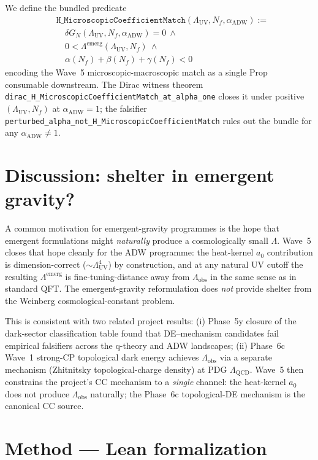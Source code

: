 \documentclass[twocolumn]{revtex4-2}
\newcommand{\Nf}{N_f}
\newcommand{\LambdaUV}{\Lambda_{\mathrm{UV}}}
\newcommand{\Lambdaemerg}{\Lambda^{\mathrm{emerg}}}
\newcommand{\Lambdaobs}{\Lambda_{\mathrm{obs}}}
\newcommand{\aADW}{\alpha_{\mathrm{ADW}}}
\newcommand{\GN}{G_{N}}
\begin{document}
We define the bundled predicate
\begin{align}
&\mathtt{H\_MicroscopicCoefficientMatch}(\LambdaUV,\Nf,\aADW) :=\nonumber\\
&\quad \delta\GN(\LambdaUV,\Nf,\aADW) = 0\ \wedge\nonumber\\
&\quad 0 < \Lambdaemerg(\LambdaUV,\Nf)\ \wedge\nonumber\\
&\quad \alpha(\Nf)+\beta(\Nf)+\gamma(\Nf) < 0
\end{align}
encoding the Wave~5 microscopic-macroscopic match as a single
Prop consumable downstream. The Dirac witness theorem
\texttt{dirac\_H\_MicroscopicCoefficientMatch\_at\_alpha\_one} closes
it under positive $(\LambdaUV,\Nf)$ at $\aADW = 1$; the falsifier
\texttt{perturbed\_alpha\_not\_H\_MicroscopicCoefficientMatch} rules
out the bundle for any $\aADW \neq 1$.

\section{Discussion: shelter in emergent gravity?}

A common motivation for emergent-gravity programmes is the hope that
emergent formulations might \emph{naturally} produce a cosmologically
small $\Lambda$. Wave~5 closes that hope cleanly for the ADW
programme:
the heat-kernel $a_{0}$ contribution is dimension-correct
($\sim \LambdaUV^{4}$) by construction, and at any natural UV cutoff
the resulting $\Lambdaemerg$ is fine-tuning-distance away from
$\Lambdaobs$ in the same sense as in standard QFT. The
emergent-gravity reformulation does \emph{not} provide shelter from
the Weinberg cosmological-constant problem.

This is consistent with two related project results:
(i) Phase~5y closure of the dark-sector classification table found
that DE--mechanism candidates fail empirical falsifiers across the
q-theory and ADW landscapes; (ii) Phase~6c Wave~1 strong-CP
topological dark energy achieves $\Lambdaobs$ via a separate
mechanism (Zhitnitsky topological-charge density) at PDG
$\Lambda_{\mathrm{QCD}}$. Wave~5 then constrains the project's CC
mechanism to a \emph{single} channel: the heat-kernel
$a_{0}$ does not produce $\Lambdaobs$ naturally; the Phase~6c
topological-DE mechanism is the canonical CC source.

\section{Method --- Lean formalization}
\end{document}
